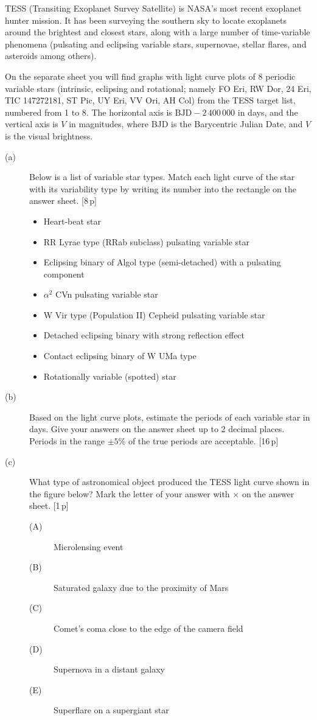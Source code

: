 TESS (Transiting Exoplanet Survey Satellite) is NASA's most recent exoplanet
hunter mission. It has been surveying the southern sky to locate exoplanets
around the brightest and closest stars, along with a large number of
time-variable phenomena (pulsating and eclipsing variable stars, supernovae,
stellar flares, and asteroids among others).

On the separate sheet you will find graphs with light curve plots of 8
periodic variable stars (intrinsic, eclipsing and rotational; namely FO Eri,
RW Dor, 24 Eri, TIC 147272181, ST Pic, UY Eri, VV Ori, AH Col) from the TESS
target list, numbered from 1 to 8. The horizontal axis is
$\mathrm{BJD} - 2\,400\,000$ in days, and the vertical axis is $V$ in
magnitudes, where BJD is the Barycentric Julian Date, and $V$ is the visual
brightness.

\begin{description}
\item[(a)] Below is a list of variable star types. Match each light curve of
  the star with its variability type by writing its number into the rectangle
  on the answer sheet. \hfill[8\,p]
  \begin{itemize}
  \item Heart-beat star
  \item RR Lyrae type (RRab subclass) pulsating variable star
  \item Eclipsing binary of Algol type (semi-detached) with a pulsating
    component
  \item $\alpha^2$ CVn pulsating variable star
  \item W Vir type (Population II) Cepheid pulsating variable star
  \item Detached eclipsing binary with strong reflection effect
  \item Contact eclipsing binary of W UMa type
  \item Rotationally variable (spotted) star
  \end{itemize}
\item[(b)] Based on the light curve plots, estimate the periods of each
  variable star in days. Give your answers on the answer sheet up to 2
  decimal places. Periods in the range $\pm5$\% of the true periods are
  acceptable. \hfill[16\,p]
\item[(c)] What type of astronomical object produced the TESS light curve
  shown in the figure below? Mark the letter of your answer with $\times$ on
  the answer sheet. \hfill[1\,p]
  \begin{description}
  \item[(A)] Microlensing event
  \item[(B)] Saturated galaxy due to the proximity of Mars
  \item[(C)] Comet's coma close to the edge of the camera field
  \item[(D)] Supernova in a distant galaxy
  \item[(E)] Superflare on a supergiant star
  \end{description}
\end{description}
